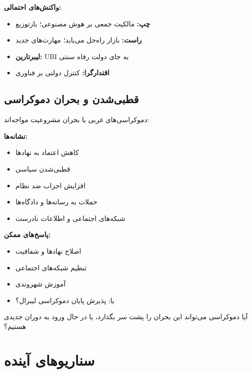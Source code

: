 \textbf{واکنش‌های احتمالی:}
\begin{itemize}
    \item \textbf{چپ:} مالکیت جمعی بر هوش مصنوعی؛ بازتوزیع
    \item \textbf{راست:} بازار راه‌حل می‌یابد؛ مهارت‌های جدید
    \item \textbf{لیبرتارین:} UBI به جای دولت رفاه سنتی
    \item \textbf{اقتدارگرا:} کنترل دولتی بر فناوری
\end{itemize}


\subsection{قطبی‌شدن و بحران دموکراسی}


دموکراسی‌های غربی با بحران مشروعیت مواجه‌اند:

\textbf{نشانه‌ها:}
\begin{itemize}
    \item کاهش اعتماد به نهادها
    \item قطبی‌شدن سیاسی
    \item افزایش احزاب ضد نظام
    \item حملات به رسانه‌ها و دادگاه‌ها
    \item شبکه‌های اجتماعی و اطلاعات نادرست
\end{itemize}

\textbf{پاسخ‌های ممکن:}
\begin{itemize}
    \item اصلاح نهادها و شفافیت
    \item تنظیم شبکه‌های اجتماعی
    \item آموزش شهروندی
    \item یا: پذیرش پایان دموکراسی لیبرال؟
\end{itemize}

آیا دموکراسی می‌تواند این بحران را پشت سر بگذارد، یا در حال ورود به دوران جدیدی هستیم؟


\section{سناریوهای آینده}

